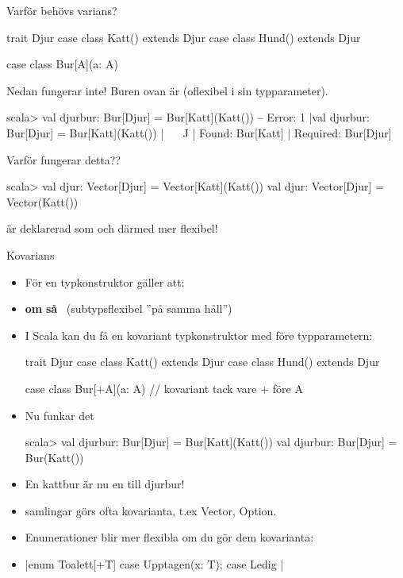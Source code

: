 \begin{Slide}{Varför behövs varians?}\SlideFontSmall
\begin{Code}
trait Djur
case class Katt() extends Djur
case class Hund() extends Djur

case class Bur[A](a: A)
\end{Code}
\pause
Nedan fungerar inte! Buren ovan är  (oflexibel i sin typparameter).
\begin{REPL}
scala> val djurbur: Bur[Djur] = Bur[Katt](Katt())
-- Error:
1 |val djurbur: Bur[Djur] = Bur[Katt](Katt())
  |                   ^^^^^^^^^^^^^^^^^
  |                   Found:    Bur[Katt]
  |                   Required: Bur[Djur]
\end{REPL}
\pause
Varför fungerar detta??
\begin{REPL}
scala> val djur: Vector[Djur] = Vector[Katt](Katt())
val djur: Vector[Djur] = Vector(Katt())
\end{REPL}
\pause {} är deklarerad som  och därmed mer flexibel!
\end{Slide}


\begin{Slide}{Kovarians }
\begin{itemize}\SlideFontSmall
\item För en  typkonstruktor  gäller att: 
\item[] \textbf{om} \code{ T <: U } \textbf{så} ~(subtypsflexibel ''på samma håll'')
\item I Scala kan du få en kovariant typkonstruktor med \code{+} före typparametern:
\begin{Code}
trait Djur
case class Katt() extends Djur
case class Hund() extends Djur

case class Bur[+A](a: A)  // kovariant tack vare + före A
\end{Code}
\pause
\item Nu funkar det \code{:)}
\begin{REPL}
scala> val djurbur: Bur[Djur] = Bur[Katt](Katt())
val djurbur: Bur[Djur] = Bur(Katt())
\end{REPL}
\item En kattbur är nu en  till djurbur!
\pause
\item {} samlingar görs ofta kovarianta, t.ex Vector, Option.
\item Enumerationer blir mer flexibla om du gör dem kovarianta:
\item[] \code|enum Toalett[+T] { case Upptagen(x: T); case Ledig }|
\end{itemize}

\end{Slide}


